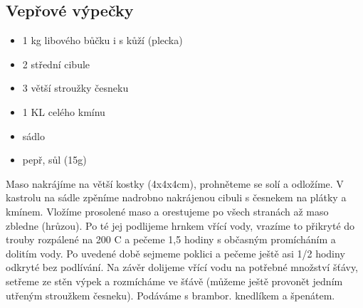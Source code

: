 \documentclass[10pt,a4paper]{article}
\newenvironment{myitemize}
{ \begin{itemize}
    \setlength{\itemsep}{0pt}
    \setlength{\parskip}{0pt}
    \setlength{\parsep}{0pt}     }
{ \end{itemize}                  }
\begin{document}
\subsection{Vepřové výpečky}
\begin{minipage}[t]{0,5\textwidth}
\begin{myitemize} 
\item 1 kg libového bůčku i s kůží (plecka)
\item 2 střední cibule
\item 3 větší stroužky česneku
\item 1 KL celého kmínu
\item sádlo
\item pepř, sůl (15g)
\end{myitemize}
\end{minipage}
\begin{minipage}[t]{0,5\textwidth}
Maso nakrájíme na větší kostky (4x4x4cm), prohněteme se solí a odložíme. V kastrolu na sádle zpěníme nadrobno nakrájenou cibuli s česnekem na plátky a kmínem. Vložíme prosolené maso a orestujeme po všech stranách až maso zbledne (hrůzou). Po té jej podlijeme hrnkem vřící vody, vrazíme to přikryté do trouby rozpálené na 200 \degree C a pečeme 1,5 hodiny s občasným promícháním a dolitím vody. Po uvedené době sejmeme poklici a pečeme ještě asi 1/2 hodiny odkryté bez podlívání. Na závěr dolijeme vřící vodu na potřebné množství šťávy, setřeme ze stěn výpek a rozmícháme ve šťávě (můžeme ještě provonět jedním utřeným stroužkem česneku). Podáváme s brambor. knedlíkem a špenátem.
\end{minipage}
\end{document}
